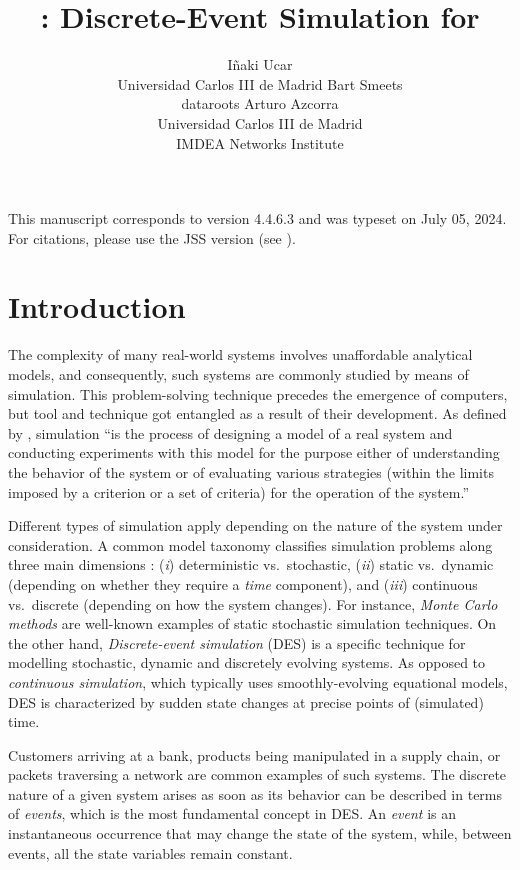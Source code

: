 \documentclass[
  nojss]{jss}
\author{
Iñaki Ucar\\Universidad Carlos III de Madrid \And Bart
Smeets\\dataroots \And Arturo Azcorra\\Universidad Carlos III de
Madrid\\
IMDEA Networks Institute
}
\title{\pkg{simmer}: Discrete-Event Simulation for \proglang{R}}
\begin{document}
\setlength{\abovedisplayskip}{0pt}

This manuscript corresponds to  version 4.4.6.3 and was
typeset on July 05, 2024. For citations, please use the JSS version (see
).

\section{Introduction}\label{introduction}

The complexity of many real-world systems involves unaffordable
analytical models, and consequently, such systems are commonly studied
by means of simulation. This problem-solving technique precedes the
emergence of computers, but tool and technique got entangled as a result
of their development. As defined by \citet{Shannon:1975:Systems},
simulation ``is the process of designing a model of a real system and
conducting experiments with this model for the purpose either of
understanding the behavior of the system or of evaluating various
strategies (within the limits imposed by a criterion or a set of
criteria) for the operation of the system.''

Different types of simulation apply depending on the nature of the
system under consideration. A common model taxonomy classifies
simulation problems along three main dimensions
\citep{Law:2000:Simulation}: (\emph{i}) deterministic vs.~stochastic,
(\emph{ii}) static vs.~dynamic (depending on whether they require a
\emph{time} component), and (\emph{iii}) continuous vs.~discrete
(depending on how the system changes). For instance, \emph{Monte Carlo
methods} are well-known examples of static stochastic simulation
techniques. On the other hand, \emph{Discrete-event simulation} (DES) is
a specific technique for modelling stochastic, dynamic and discretely
evolving systems. As opposed to \emph{continuous simulation}, which
typically uses smoothly-evolving equational models, DES is characterized
by sudden state changes at precise points of (simulated) time.

Customers arriving at a bank, products being manipulated in a supply
chain, or packets traversing a network are common examples of such
systems. The discrete nature of a given system arises as soon as its
behavior can be described in terms of \emph{events}, which is the most
fundamental concept in DES. An \emph{event} is an instantaneous
occurrence that may change the state of the system, while, between
events, all the state variables remain constant.
\end{document}
